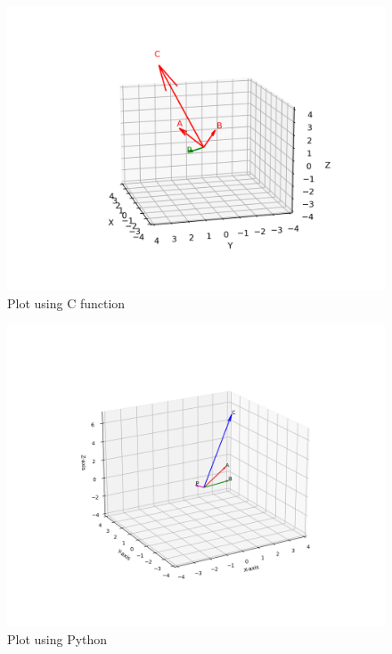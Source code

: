 \documentclass[journal,12pt,onecolumn]{IEEEtran}
\begin{document}
\begin{figure}[H]
	\centering
	\includegraphics[scale=0.5]{img}
	\caption*{Plot using C function}
	\label{img}
\end{figure}
\begin{figure}[H]
	\centering
	\includegraphics[scale=0.5]{fig}
	\caption*{Plot using Python}
	\label{fig}
\end{figure}
\end{document}
